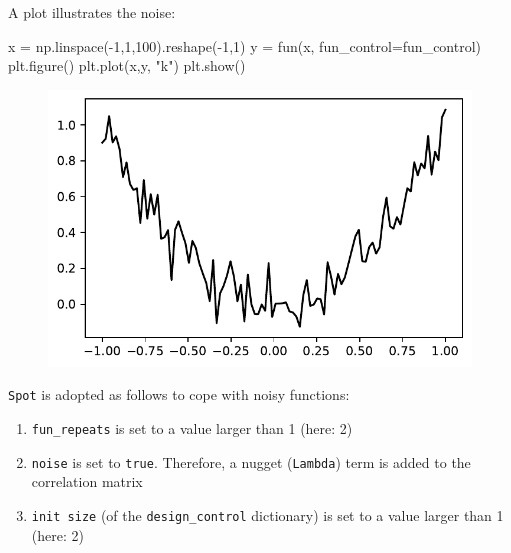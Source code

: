 \documentclass[
  letterpaper,
  DIV=11,
  numbers=noendperiod]{scrreprt}
\newenvironment{Shaded}{\begin{snugshade}}{\end{snugshade}}
\newcommand{\DecValTok}[1]{\textcolor[rgb]{0.68,0.00,0.00}{#1}}
\newcommand{\NormalTok}[1]{\textcolor[rgb]{0.00,0.23,0.31}{#1}}
\newcommand{\OperatorTok}[1]{\textcolor[rgb]{0.37,0.37,0.37}{#1}}
\newcommand{\StringTok}[1]{\textcolor[rgb]{0.13,0.47,0.30}{#1}}
\providecommand{\tightlist}{%
  \setlength{\itemsep}{0pt}\setlength{\parskip}{0pt}}\usepackage{longtable,booktabs,array}
\begin{document}
A plot illustrates the noise:

\begin{Shaded}
\begin{Highlighting}[]
\NormalTok{x }\OperatorTok{=}\NormalTok{ np.linspace(}\OperatorTok{{-}}\DecValTok{1}\NormalTok{,}\DecValTok{1}\NormalTok{,}\DecValTok{100}\NormalTok{).reshape(}\OperatorTok{{-}}\DecValTok{1}\NormalTok{,}\DecValTok{1}\NormalTok{)}
\NormalTok{y }\OperatorTok{=}\NormalTok{ fun(x, fun\_control}\OperatorTok{=}\NormalTok{fun\_control)}
\NormalTok{plt.figure()}
\NormalTok{plt.plot(x,y, }\StringTok{"k"}\NormalTok{)}
\NormalTok{plt.show()}
\end{Highlighting}
\end{Shaded}

\begin{figure}[H]

{\centering \includegraphics{09_spot_ocba_files/figure-pdf/cell-4-output-1.pdf}

}

\end{figure}

\texttt{Spot} is adopted as follows to cope with noisy functions:

\begin{enumerate}
\def\labelenumi{\arabic{enumi}.}
\tightlist
\item
  \texttt{fun\_repeats} is set to a value larger than 1 (here: 2)
\item
  \texttt{noise} is set to \texttt{true}. Therefore, a nugget
  (\texttt{Lambda}) term is added to the correlation matrix
\item
  \texttt{init\ size} (of the \texttt{design\_control} dictionary) is
  set to a value larger than 1 (here: 2)
\end{enumerate}
\end{document}
